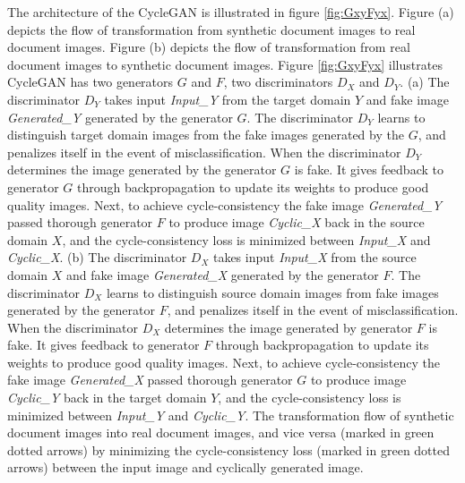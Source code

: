 The architecture of the \ac{CycleGAN} is illustrated in figure \ref{fig:GxyFyx}. Figure (a) depicts the flow of transformation from synthetic document images to real document images. Figure (b) depicts the flow of transformation from real document images to synthetic document images. Figure \ref{fig:GxyFyx} illustrates \ac{CycleGAN} has two generators $G$ and $F$, two discriminators $D_X$ and $D_Y$. (a) The discriminator $D_Y$ takes input \textit{Input\_Y} from the target domain $Y$ and fake image \textit{Generated\_Y} generated by the generator $G$. The discriminator $D_Y$ learns to distinguish target domain images from the fake images generated by the $G$, and penalizes itself in the event of misclassification. When the discriminator $D_Y$ determines the image generated by the generator $G$ is fake. It gives feedback to generator $G$ through backpropagation to update its weights to produce good quality images. Next, to achieve cycle-consistency the fake image \textit{Generated\_Y} passed thorough generator $F$ to produce image \textit{Cyclic\_X} back in the source domain $X$, and the cycle-consistency loss is minimized between \textit{Input\_X} and \textit{Cyclic\_X}. (b) The discriminator $D_X$ takes input \textit{Input\_X} from the source domain $X$ and fake image \textit{Generated\_X} generated by the generator $F$. The discriminator $D_X$ learns to distinguish source domain images from fake images generated by the generator $F$, and penalizes itself in the event of misclassification. When the discriminator $D_X$ determines the image generated by generator $F$ is fake. It gives feedback to generator $F$ through backpropagation to update its weights to produce good quality images. Next, to achieve cycle-consistency the fake image \textit{Generated\_X} passed thorough generator $G$ to produce image \textit{Cyclic\_Y} back in the target domain $Y$, and the cycle-consistency loss is minimized between \textit{Input\_Y} and \textit{Cyclic\_Y}. The transformation flow of synthetic document images into real document images, and vice versa (marked in green dotted arrows) by minimizing the cycle-consistency loss (marked in green dotted arrows) between the input image and cyclically generated image. 





